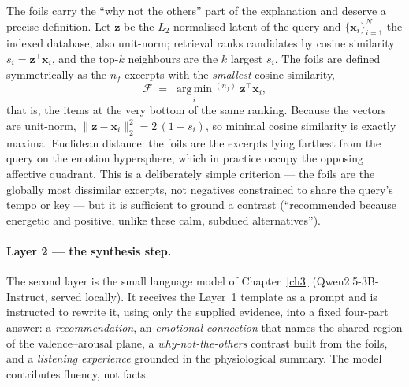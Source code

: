 \documentclass[12pt]{report}
\begin{document}
The foils carry the ``why not the others'' part of the explanation and deserve a precise definition. Let $\mathbf{z}$ be the $L_{2}$-normalised latent of the query and $\{\mathbf{x}_{i}\}_{i=1}^{N}$ the indexed database, also unit-norm; retrieval ranks candidates by cosine similarity $s_{i}=\mathbf{z}^{\top}\mathbf{x}_{i}$, and the top-$k$ neighbours are the $k$ largest $s_{i}$. The foils are defined symmetrically as the $n_{f}$ excerpts with the \emph{smallest} cosine similarity,
\begin{equation}
\label{eq:foils}
\mathcal{F} \;=\; \operatorname*{arg\,min}_{i}{}^{(n_{f})}\; \mathbf{z}^{\top}\mathbf{x}_{i},
\end{equation}
that is, the items at the very bottom of the same ranking. Because the vectors are unit-norm, $\lVert \mathbf{z}-\mathbf{x}_{i}\rVert_{2}^{2}=2\,(1-s_{i})$, so minimal cosine similarity is exactly maximal Euclidean distance: the foils are the excerpts lying farthest from the query on the emotion hypersphere, which in practice occupy the opposing affective quadrant. This is a deliberately simple criterion --- the foils are the globally most dissimilar excerpts, not negatives constrained to share the query's tempo or key --- but it is sufficient to ground a contrast (``recommended because energetic and positive, unlike these calm, subdued alternatives'').

\paragraph{Layer 2 --- the synthesis step.} The second layer is the small language model of Chapter~\ref{ch3} (Qwen2.5-3B-Instruct, served locally). It receives the Layer~1 template as a prompt and is instructed to rewrite it, using only the supplied evidence, into a fixed four-part answer: a \emph{recommendation}, an \emph{emotional connection} that names the shared region of the valence--arousal plane, a \emph{why-not-the-others} contrast built from the foils, and a \emph{listening experience} grounded in the physiological summary. The model contributes fluency, not facts.
\end{document}
